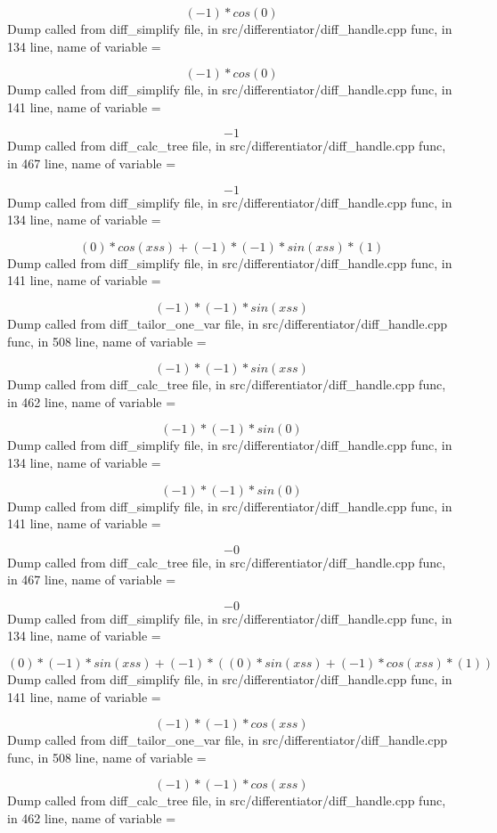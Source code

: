 \documentclass{article}
\begin{document}
$$
(-1) *  cos (0)
$$
Dump called from diff_simplify file, in src/differentiator/diff_handle.cpp func, in 134 line, name of variable = 


$$
(-1) *  cos (0)
$$
Dump called from diff_simplify file, in src/differentiator/diff_handle.cpp func, in 141 line, name of variable = 


$$
-1
$$
Dump called from diff_calc_tree file, in src/differentiator/diff_handle.cpp func, in 467 line, name of variable = 


$$
-1
$$
Dump called from diff_simplify file, in src/differentiator/diff_handle.cpp func, in 134 line, name of variable = 


$$
(0) *  cos (xss) + (-1) * (-1) *  sin (xss) * (1)
$$
Dump called from diff_simplify file, in src/differentiator/diff_handle.cpp func, in 141 line, name of variable = 


$$
(-1) * (-1) *  sin (xss)
$$
Dump called from diff_tailor_one_var file, in src/differentiator/diff_handle.cpp func, in 508 line, name of variable = 


$$
(-1) * (-1) *  sin (xss)
$$
Dump called from diff_calc_tree file, in src/differentiator/diff_handle.cpp func, in 462 line, name of variable = 


$$
(-1) * (-1) *  sin (0)
$$
Dump called from diff_simplify file, in src/differentiator/diff_handle.cpp func, in 134 line, name of variable = 


$$
(-1) * (-1) *  sin (0)
$$
Dump called from diff_simplify file, in src/differentiator/diff_handle.cpp func, in 141 line, name of variable = 


$$
-0
$$
Dump called from diff_calc_tree file, in src/differentiator/diff_handle.cpp func, in 467 line, name of variable = 


$$
-0
$$
Dump called from diff_simplify file, in src/differentiator/diff_handle.cpp func, in 134 line, name of variable = 


$$
(0) * (-1) *  sin (xss) + (-1) * ((0) *  sin (xss) + (-1) *  cos (xss) * (1))
$$
Dump called from diff_simplify file, in src/differentiator/diff_handle.cpp func, in 141 line, name of variable = 


$$
(-1) * (-1) *  cos (xss)
$$
Dump called from diff_tailor_one_var file, in src/differentiator/diff_handle.cpp func, in 508 line, name of variable = 


$$
(-1) * (-1) *  cos (xss)
$$
Dump called from diff_calc_tree file, in src/differentiator/diff_handle.cpp func, in 462 line, name of variable = 
\end{document}
